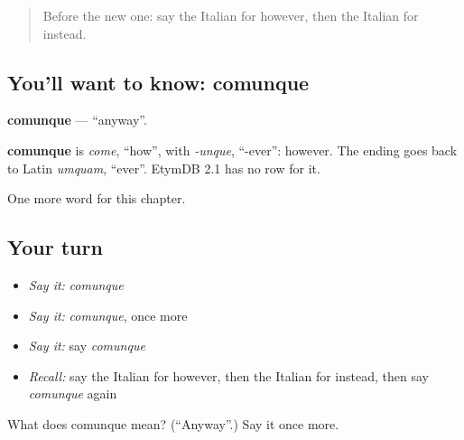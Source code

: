 \begin{quote}
Before the new one: say the Italian for however, then the Italian for instead.
\end{quote}

\subsection*{You'll want to know: comunque}
\textbf{comunque} — \textquotedblleft{}anyway\textquotedblright{}.

\begin{cousinweb}
\textbf{comunque} is \emph{come}, \textquotedblleft{}how\textquotedblright{}, with \emph{-unque}, \textquotedblleft{}-ever\textquotedblright{}: however. The ending goes back to Latin \emph{umquam}, \textquotedblleft{}ever\textquotedblright{}. EtymDB 2.1 has no row for it.
\end{cousinweb}

\begin{grammarlens}[title={What you've built}]
One more word for this chapter.
\end{grammarlens}

\subsection*{Your turn}
\begin{itemize}
\raggedright
  \item \emph{Say it:} \emph{comunque}
  \item \emph{Say it:} \emph{comunque}, once more
  \item \emph{Say it:} say \emph{comunque}
  \item \emph{Recall:} say the Italian for however, then the Italian for instead, then say \emph{comunque} again
\end{itemize}

\begin{tcolorbox}[breakable,colback=teal!4,colframe=teal!35!black,title={Before you move on}]
What does comunque mean? (\textquotedblleft{}Anyway\textquotedblright{}.) Say it once more.
\end{tcolorbox}
